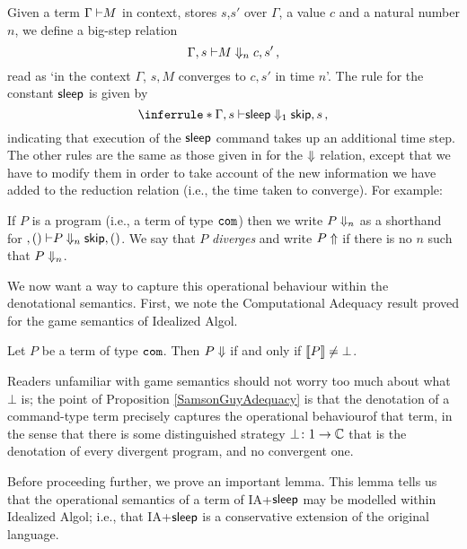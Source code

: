 \documentclass{article}
\begin{document}
Given a term $\Gamma{\;\vdash} M$ in context, stores $s$,$s'$ over $\Gamma$, a value $c$ and a natural number $n$, we define a big-step relation
\[
  \Gamma,s{\;\vdash} M\Downarrow_n c,s'\,,
  \]
read as `in the context $\Gamma$, $s,M$ converges to $c,s'$ in time $n$'.  
The rule for the constant ${\mathsf{sleep}}$ is given by
\[
  \inferrule*
  { }
  {\Gamma,s\ts \sleep\converges_1 \skipp,s}\,,
  \]
indicating that execution of the ${\mathsf{sleep}}$ command takes up an additional time step.  
The other rules are the same as those given in \cite{SamsonGuyIAActive} for the $\Downarrow$ relation, except that we have to modify them in order to take account of the new information we have added to the reduction relation (i.e., the time taken to converge).
For example:
If $P$ is a program (i.e., a term of type ${\mathtt{com}}$) then we write $P\Downarrow_n$ as a shorthand for $,(){\;\vdash} P \Downarrow_n {\mathsf{skip}},()$.
We say that $P$ \emph{diverges} and write $P\Uparrow$ if there is no $n$ such that $P\Downarrow_n$.

We now want a way to capture this operational behaviour within the denotational semantics.
First, we note the Computational Adequacy result proved for the game semantics of Idealized Algol.

\begin{proposition}
  Let $P$ be a term of type ${\mathtt{com}}$.  
  Then $P\Downarrow$ if and only if $\left\llbracket P\right\rrbracket\ne\bot$.
  \label{SamsonGuyAdequacy}
\end{proposition}

Readers unfamiliar with game semantics should not worry too much about what $\bot$ is; the point of Proposition \ref{SamsonGuyAdequacy} is that the denotation of a command-type term precisely captures the operational behaviourof that term, in the sense that there is some distinguished strategy $\bot\colon 1 \to \mathbb{C}$ that is the denotation of every divergent program, and no convergent one.

Before proceeding further, we prove an important lemma.  
This lemma tells us that the operational semantics of a term of IA+${\mathsf{sleep}}$ may be modelled within Idealized Algol; i.e., that IA+${\mathsf{sleep}}$ is a conservative extension of the original language.
\end{document}

